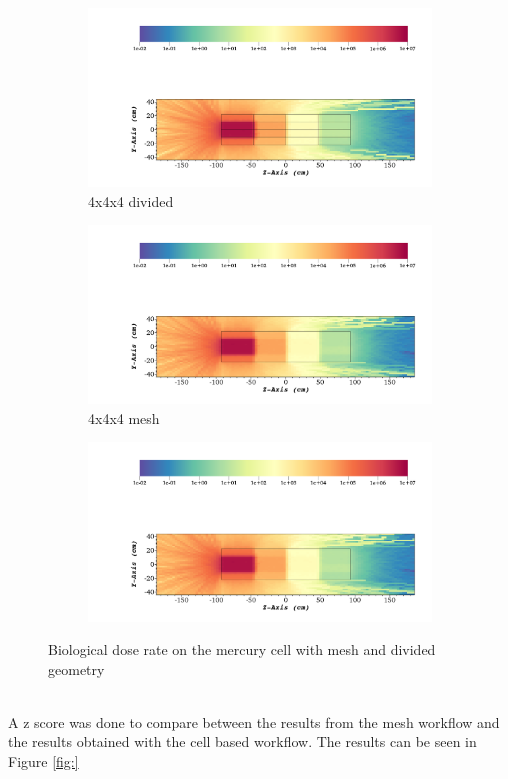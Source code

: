 \begin{figure}
	\begin{subfigure}[t]{0.5\textwidth}
		\includegraphics[width=\linewidth, trim={5cm 1cm 2cm 16cm},clip]{../figs/toy_p1/dose_VPI_4x_split.png}
		\caption{4x4x4 divided}
		\label{fig:1dose_4x_split}
	\end{subfigure}\hfill
	\begin{subfigure}[t]{0.5\textwidth}
		\includegraphics[width=\linewidth, trim={5cm 1cm 2cm 16cm},clip]{../figs/toy_p1/dose_VPI_4x_mesh.png}
		\caption{4x4x4 mesh}
		\label{fig:1dose_4x_mesh}
	\end{subfigure}

	\begin{subfigure}[t]{1.0\textwidth}
		\includegraphics[width=\linewidth, trim={5cm 25cm 2cm 2cm},clip]{../figs/toy_p1/dose_VPI_4x_mesh.png}
		\label{fig:1legend}
	\end{subfigure}
	\caption{Biological dose rate on the mercury cell with mesh and divided geometry}
	\label{fig:1dose}
\end{figure}
\\
A z score was done to compare between the results from the mesh workflow and the results
obtained with the cell based workflow. The results can be seen in Figure \ref{fig:}


